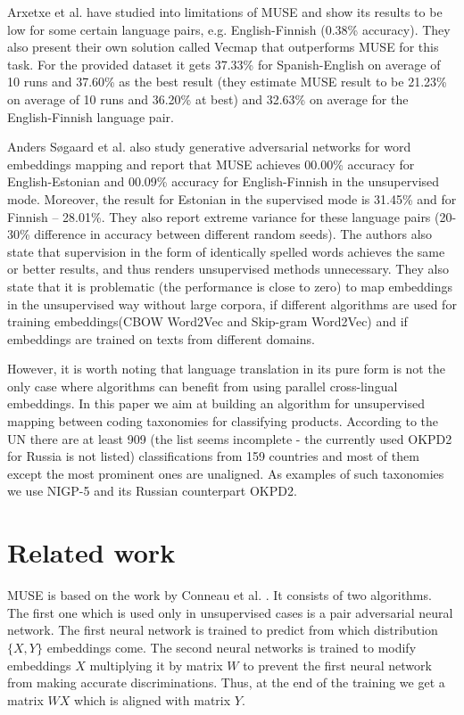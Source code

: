 \documentclass[conference]{IEEEtran}
\begin{document}
Arxetxe et al. have studied into limitations of MUSE and show its results to be low for some certain language pairs, e.g. English-Finnish (0.38\% accuracy). They also present their own solution called Vecmap \cite{vecmap} that outperforms MUSE for this task. For the provided dataset it gets 37.33\% for Spanish-English on average of 10 runs and 37.60\% as the best result (they estimate MUSE result to be 21.23\% on average of 10 runs and 36.20\% at best) and 32.63\% on average for the English-Finnish language pair.

Anders Søgaard et al. \cite{ruder-muse-limitations} also study generative adversarial networks for word embeddings mapping and report that MUSE achieves 00.00\% accuracy for English-Estonian and 00.09\% accuracy for English-Finnish in the unsupervised mode. Moreover, the result for Estonian in the supervised mode is 31.45\% and for Finnish -- 28.01\%. They also report extreme variance for these language pairs (20-30\% difference in accuracy between different random seeds). The authors also state that supervision in the form of identically spelled words achieves the same or better results, and thus renders unsupervised methods unnecessary. They also state that it is problematic (the performance is close to zero) to map embeddings in the unsupervised way without large corpora, if different algorithms are used for training embeddings(CBOW Word2Vec and Skip-gram Word2Vec) and if embeddings are trained on texts from different domains.

However, it is worth noting that language translation in its pure form is not the only case where algorithms can benefit from using parallel cross-lingual embeddings. In this paper we aim at building an algorithm for unsupervised mapping between coding taxonomies for classifying products. According to the UN \cite{unsd} there are at least 909 (the list seems incomplete - the currently used OKPD2 for Russia is not listed) classifications from 159 countries and most of them except the most prominent ones are unaligned. As examples of such taxonomies we use NIGP-5 and its Russian counterpart OKPD2.

\section{Related work}

MUSE is based on the work by Conneau et al. \cite{muse}. It consists of two algorithms. The first one which is used only in unsupervised cases is a pair adversarial neural network. The first neural network is trained to predict from which distribution $\{X, Y\}$ embeddings come. The second neural networks is trained to modify embeddings $X$ multiplying it by matrix $W$ to prevent the first neural network from making accurate discriminations. Thus, at the end of the training we get a matrix $WX$ which is aligned with matrix $Y$.
\end{document}
